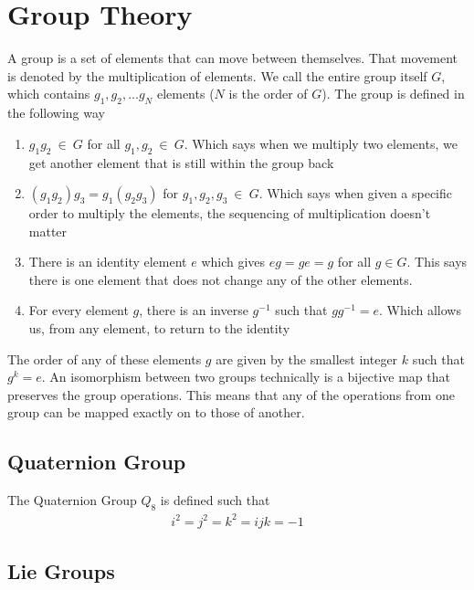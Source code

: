\chapter{Group Theory}

A group is a set of elements that can move between themselves. That movement is denoted by the multiplication of elements. We call the entire group itself $G$, which contains $g_1, g_2, ... g_N$ elements ($N$ is the order of $G$). The group is defined in the following way
\begin{enumerate}
	\item $g_1g_2~\in ~G$ for all $g_1, g_2~\in~ G$. Which says when we multiply two elements, we get another element that is still within the group back
	\item $(g_1g_2)g_3 = g_1(g_2g_3)$ for $g_1, g_2, g_3~\in~ G$. Which says when given a specific order to multiply the elements, the sequencing of multiplication doesn't matter
	\item There is an identity element $e$ which gives $eg = ge = g$ for all $g\in G$. This says there is one element that does not change any of the other elements.
	\item For every element $g$, there is an inverse $g^{-1}$ such that $gg^{-1} = e$. Which allows us, from any element, to return to the identity
\end{enumerate}
The order of any of these elements $g$ are given by the smallest integer $k$ such that $g^k = e$.
An isomorphism between two groups technically is a bijective map that preserves the group operations. This means that any of the operations from one group can be mapped exactly on to those of another.

\section{Quaternion Group}
The Quaternion Group $Q_8$ is defined such that
\begin{align}
	i^2 = j^2 = k^2 = ijk = -1
\end{align}

%
%
%
\section{Lie Groups}

